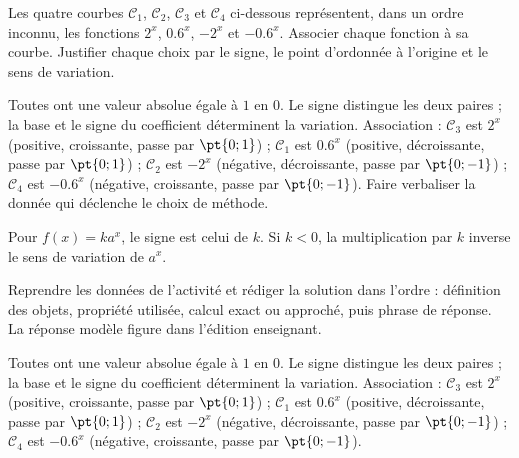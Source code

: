 \begin{activity}
Les quatre courbes $\mathcal C_1$, $\mathcal C_2$, $\mathcal C_3$ et $\mathcal C_4$ ci-dessous représentent, dans un ordre inconnu, les fonctions $2^x$, $\num{0,6}^x$, $-2^x$ et $-\num{0,6}^x$. Associer chaque fonction à sa courbe. Justifier chaque choix par le signe, le point d'ordonnée à l'origine et le sens de variation.
\begin{center}\end{center}
\end{activity}
\begin{solution}Toutes ont une valeur absolue égale à $1$ en $0$. Le signe distingue les deux paires ; la base et le signe du coefficient déterminent la variation. Association : $\mathcal C_3$ est $2^x$ (positive, croissante, passe par $\pt{0;1}$) ; $\mathcal C_1$ est $\num{0,6}^x$ (positive, décroissante, passe par $\pt{0;1}$) ; $\mathcal C_2$ est $-2^x$ (négative, décroissante, passe par $\pt{0;-1}$) ; $\mathcal C_4$ est $-\num{0,6}^x$ (négative, croissante, passe par $\pt{0;-1}$). Faire verbaliser la donnée qui déclenche le choix de méthode.\end{solution}

\begin{summary}Pour $f(x)=ka^x$, le signe est celui de $k$. Si $k<0$, la multiplication par $k$ inverse le sens de variation de $a^x$.\end{summary}

\begin{example}
Reprendre les données de l'activité et rédiger la solution dans l'ordre : définition des objets, propriété utilisée, calcul exact ou approché, puis phrase de réponse. La réponse modèle figure dans l'édition enseignant.
\end{example}
\begin{solution}Toutes ont une valeur absolue égale à $1$ en $0$. Le signe distingue les deux paires ; la base et le signe du coefficient déterminent la variation. Association : $\mathcal C_3$ est $2^x$ (positive, croissante, passe par $\pt{0;1}$) ; $\mathcal C_1$ est $\num{0,6}^x$ (positive, décroissante, passe par $\pt{0;1}$) ; $\mathcal C_2$ est $-2^x$ (négative, décroissante, passe par $\pt{0;-1}$) ; $\mathcal C_4$ est $-\num{0,6}^x$ (négative, croissante, passe par $\pt{0;-1}$).\end{solution}

